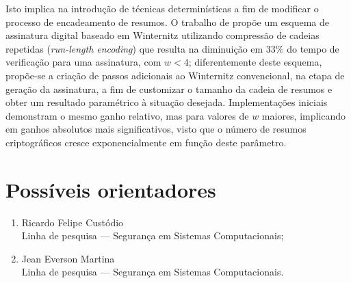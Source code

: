 \documentclass[12pt]{article}
\begin{document}
Isto implica na introdução de técnicas determinísticas a fim de modificar o
processo de encadeamento de resumos. O trabalho de
\cite{Steinwandt:2008:OSU:1412758.1412979} propõe um esquema de assinatura
digital baseado em Winternitz utilizando compressão de cadeias repetidas
(\emph{run-length encoding}) que resulta na diminuição em $33\%$ do tempo de
verificação para uma assinatura, com $w < 4$; diferentemente deste esquema,
propõe-se a criação de passos adicionais ao Winternitz convencional, na etapa
de geração da assinatura, a fim de customizar o tamanho da cadeia de resumos e
obter um resultado paramétrico à situação desejada.  Implementações iniciais
demonstram o mesmo ganho relativo, mas para valores de $w$ maiores, implicando
em ganhos absolutos mais significativos, visto que o número de resumos
criptográficos cresce exponencialmente em função deste parâmetro.

\section{Possíveis orientadores}

\begin{enumerate}
    \item Ricardo Felipe Custódio \\
    Linha de pesquisa --- Segurança em Sistemas Computacionais;
    \item Jean Everson Martina \\
    Linha de pesquisa --- Segurança em Sistemas Computacionais.
\end{enumerate}



\end{document}
